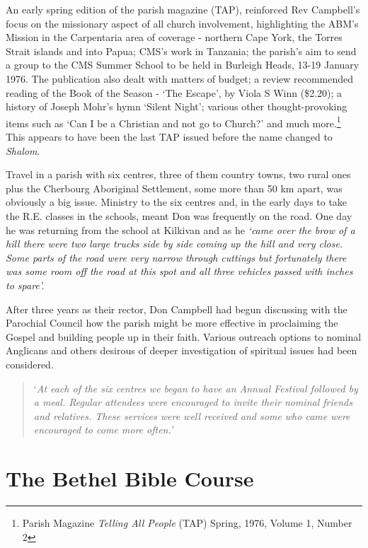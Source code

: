 An early spring edition of the parish magazine (TAP), reinforced Rev
Campbell's focus on the missionary aspect of all church involvement,
highlighting the ABM's Mission in the Carpentaria area of coverage -
northern Cape York, the Torres Strait islands and into Papua; CMS's work
in Tanzania; the parish's aim to send a group to the CMS Summer School
to be held in Burleigh Heads, 13-19 January 1976. The publication also
dealt with matters of budget; a review recommended reading of the Book
of the Season - `The Escape', by Viola S Winn (\$2.20); a history of
Joseph Mohr's hymn `Silent Night'; various other thought-provoking items
such as `Can I be a Christian and not go to Church?' and much
more.\footnote{Parish Magazine \emph{Telling All People} (TAP) Spring,
  1976, Volume 1, Number 2} This appears to have been the last TAP
issued before the name changed to \emph{Shalom}.

Travel in a parish with six centres, three of them country towns, two
rural ones plus the Cherbourg Aboriginal Settlement, some more than 50
km apart, was obviously a big issue. Ministry to the six centres and, in
the early days to take the R.E. classes in the schools, meant Don was
frequently on the road. One day he was returning from the school at
Kilkivan and as he \emph{`came over the brow of a hill there were two
large trucks side by side coming up the hill and very close. Some parts
of the road were very narrow through cuttings but fortunately there was
some room off the road at this spot and all three vehicles passed with
inches to spare'.}

After three years as their rector, Don Campbell had begun discussing
with the Parochial Council how the parish might be more effective in
proclaiming the Gospel and building people up in their faith. Various
outreach options to nominal Anglicans and others desirous of deeper
investigation of spiritual issues had been considered.

\begin{quote}
`\emph{At each of the six centres we began to have an Annual Festival
followed by a meal. Regular attendees were encouraged to invite their
nominal friends and relatives. These services were well received and
some who came were encouraged to come more often.'}
\end{quote}

\section{The Bethel Bible Course}

